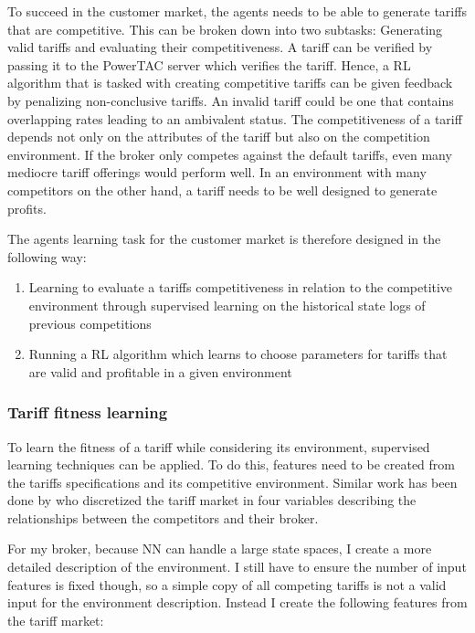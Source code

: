 To succeed in the customer market, the agents needs to be able to generate tariffs that are competitive. This can be
broken down into two subtasks: Generating valid tariffs and evaluating their competitiveness. A tariff can be
verified by passing it to the \ac {PowerTAC} server which verifies the tariff. Hence, a \ac {RL} algorithm that is
tasked with creating competitive tariffs can be given feedback by penalizing non-conclusive tariffs. An invalid tariff
could be one that contains overlapping rates leading to an ambivalent status. The competitiveness of a tariff depends
not only on the attributes of the tariff but also on the competition environment. If the broker only competes against
the default tariffs, even many mediocre tariff offerings would perform well. In an environment with many competitors on
the other hand, a tariff needs to be well designed to generate profits. 

The agents learning task for the customer market is therefore designed in the following way:

\begin{enumerate}
    \item Learning to evaluate a tariffs competitiveness in relation to the competitive environment through supervised
        learning on the historical state logs of previous competitions 
    \item Running a \ac {RL} algorithm which learns to choose parameters for tariffs that are valid and profitable in a
        given environment
\end{enumerate}

\subsubsection{Tariff fitness learning}
To learn the fitness of a tariff while considering its environment, supervised learning techniques can be applied. To do
this, features need to be created from the tariffs specifications and its competitive environment. Similar work has been
done by \citet{cuevas2015distributed} who discretized the tariff market in four variables describing the
relationships between the competitors and their broker.   

For my broker, because \ac {NN} can handle a large state spaces, I create a more detailed description of the
environment. I still have to ensure the number of input features is fixed though, so a simple copy of all competing
tariffs is not a valid input for the environment description. Instead I create the following features from the tariff
market:


